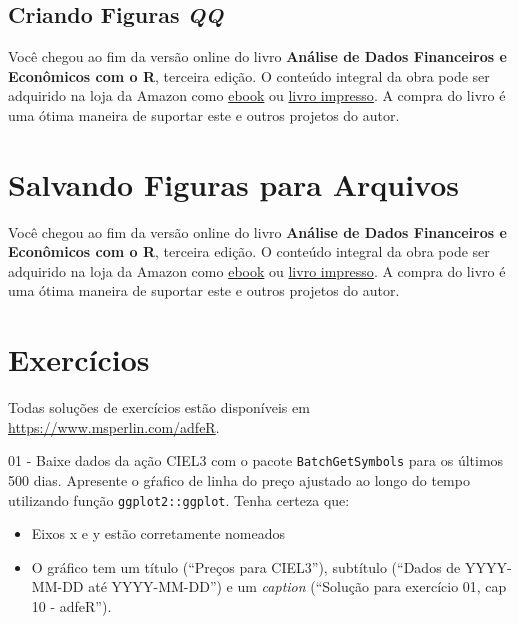 \documentclass[
  11pt,
]{book}
\providecommand{\tightlist}{%
  \setlength{\itemsep}{0pt}\setlength{\parskip}{0pt}}
\newenvironment{pleasebuyit}
{\begin{noteblock}
		
	} {\end{noteblock}}
\begin{document}
\hypertarget{criando-figuras-qq}{%
\subsection{\texorpdfstring{Criando Figuras \emph{QQ}}{Criando Figuras QQ}}\label{criando-figuras-qq}}

\begin{pleasebuyit}
Você chegou ao fim da versão online do livro \textbf{Análise de Dados
Financeiros e Econômicos com o R}, terceira edição. O conteúdo integral
da obra pode ser adquirido na loja da Amazon como
\href{https://www.amazon.com.br/dp/B08WNC27ZY}{ebook} ou
\href{https://www.amazon.com/dp/B08WP8CCDB}{livro impresso}. A compra do
livro é uma ótima maneira de suportar este e outros projetos do autor.
\end{pleasebuyit}

\hypertarget{salvando-figuras-para-arquivos}{%
\section{Salvando Figuras para Arquivos}\label{salvando-figuras-para-arquivos}}

\begin{pleasebuyit}
Você chegou ao fim da versão online do livro \textbf{Análise de Dados
Financeiros e Econômicos com o R}, terceira edição. O conteúdo integral
da obra pode ser adquirido na loja da Amazon como
\href{https://www.amazon.com.br/dp/B08WNC27ZY}{ebook} ou
\href{https://www.amazon.com/dp/B08WP8CCDB}{livro impresso}. A compra do
livro é uma ótima maneira de suportar este e outros projetos do autor.
\end{pleasebuyit}

\hypertarget{exerc-figuras}{%
\section{Exercícios}\label{exerc-figuras}}

Todas soluções de exercícios estão disponíveis em \url{https://www.msperlin.com/adfeR}.

01 -
Baixe dados da ação CIEL3 com o pacote \texttt{BatchGetSymbols} para os últimos 500 dias. Apresente o gŕafico de linha do preço ajustado ao longo do tempo utilizando função \texttt{ggplot2::ggplot}. Tenha certeza que:

\begin{itemize}
\tightlist
\item
  Eixos x e y estão corretamente nomeados
\item
  O gráfico tem um título (``Preços para CIEL3''), subtítulo (``Dados de YYYY-MM-DD até YYYY-MM-DD'') e um \emph{caption} (``Solução para exercício 01, cap 10 - adfeR'').
\end{itemize}
\end{document}

